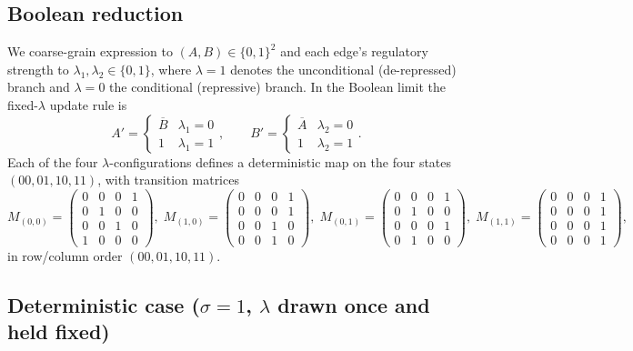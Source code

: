 \documentclass[11pt]{article}
\begin{document}
\subsection{Boolean reduction}

We coarse-grain expression to $(A,B)\in\{0,1\}^2$ and each edge's regulatory
strength to $\lambda_{1},\lambda_{2}\in\{0,1\}$, where $\lambda=1$ denotes the
unconditional (de-repressed) branch and $\lambda=0$ the conditional (repressive)
branch. In the Boolean limit the fixed-$\lambda$ update rule is
\begin{equation}
  A' = \begin{cases}\overline{B} & \lambda_{1}=0\\[2pt] 1 & \lambda_{1}=1\end{cases},
  \qquad
  B' = \begin{cases}\overline{A} & \lambda_{2}=0\\[2pt] 1 & \lambda_{2}=1\end{cases}.
  \label{eq:boolupdate}
\end{equation}
Each of the four $\lambda$-configurations defines a deterministic map on the four
states $(00,01,10,11)$, with transition matrices
\begin{equation}
  M_{(0,0)}=\!\begin{pmatrix}0&0&0&1\\0&1&0&0\\0&0&1&0\\1&0&0&0\end{pmatrix}\!,\;
  M_{(1,0)}=\!\begin{pmatrix}0&0&0&1\\0&0&0&1\\0&0&1&0\\0&0&1&0\end{pmatrix}\!,\;
  M_{(0,1)}=\!\begin{pmatrix}0&0&0&1\\0&1&0&0\\0&0&0&1\\0&1&0&0\end{pmatrix}\!,\;
  M_{(1,1)}=\!\begin{pmatrix}0&0&0&1\\0&0&0&1\\0&0&0&1\\0&0&0&1\end{pmatrix}\!,
  \label{eq:configmaps}
\end{equation}
in row/column order $(00,01,10,11)$.

\subsection{Deterministic case ($\sigma=1$, $\lambda$ drawn once and held fixed)}
\label{sec:quenched}
\end{document}
